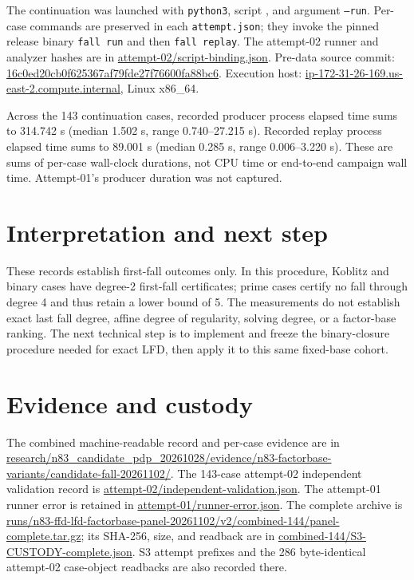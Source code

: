 \documentclass[11pt]{article}
\begin{document}
The continuation was launched with \texttt{python3}, script , and argument \texttt{--run}. Per-case commands are preserved in each \texttt{attempt.json}; they invoke the pinned release binary \texttt{fall run} and then \texttt{fall replay}. The attempt-02 runner and analyzer hashes are in \url{attempt-02/script-binding.json}. Pre-data source commit: \url{16c0ed20cb0f625367af79fde27f76600fa88bc6}. Execution host: \url{ip-172-31-26-169.us-east-2.compute.internal}, Linux x86\_64.

Across the 143 continuation cases, recorded producer process elapsed time sums to 314.742 s (median 1.502 s, range 0.740--27.215 s). Recorded replay process elapsed time sums to 89.001 s (median 0.285 s, range 0.006--3.220 s). These are sums of per-case wall-clock durations, not CPU time or end-to-end campaign wall time. Attempt-01's producer duration was not captured.

\section*{Interpretation and next step}
These records establish first-fall outcomes only. In this procedure, Koblitz and binary cases have degree-2 first-fall certificates; prime cases certify no fall through degree 4 and thus retain a lower bound of 5. The measurements do not establish exact last fall degree, affine degree of regularity, solving degree, or a factor-base ranking. The next technical step is to implement and freeze the binary-closure procedure needed for exact LFD, then apply it to this same fixed-base cohort.

\section*{Evidence and custody}
The combined machine-readable record and per-case evidence are in \url{research/n83_candidate_pdp_20261028/evidence/n83-factorbase-variants/candidate-fall-20261102/}. The 143-case attempt-02 independent validation record is \url{attempt-02/independent-validation.json}. The attempt-01 runner error is retained in \url{attempt-01/runner-error.json}. The complete archive is \url{runs/n83-ffd-lfd-factorbase-panel-20261102/v2/combined-144/panel-complete.tar.gz}; its SHA-256, size, and readback are in \url{combined-144/S3-CUSTODY-complete.json}. S3 attempt prefixes and the 286 byte-identical attempt-02 case-object readbacks are also recorded there.
\end{document}
